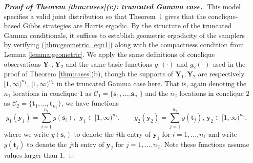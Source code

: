 \documentclass[12pt]{article}
\theoremstyle{definition}
\begin{document}
\begin{proof}[\bf Proof of Theorem \ref{thm:cases}(c): truncated Gamma case.]
This model specifies a valid joint distribution so that Theorem~1 gives that the conclique-based Gibbs strategies are Harris ergodic.  By the structure of the truncated Gamma conditionals, it suffices to establish geometric ergodicity of the samplers  by verifying (\ref{thm:geometric_eqn1})  along with the compactness condition from Lemma \ref{lemma:geometric}.
We apply the same definitions of  conclique observations $\boldsymbol Y_1,\boldsymbol Y_2$ and the same basic functions $g_1(\cdot)$ and $g_2(\cdot)$
  used in the proof of Theorem \ref{thm:cases}(b), though the supports of $\boldsymbol Y_1,\boldsymbol Y_2$ are respectively 
  $[1,\infty)^{n_1}$, $[1,\infty)^{n_2}$ in the truncated Gamma case here.   That is, again denoting the $n_1$ locations in conclique $1$ as $\mathcal{C}_1 = \{\boldsymbol s_1, \dots, \boldsymbol  s_{n_1}\}$ and the $n_2$ locations in conclique $2$ as $\mathcal{C}_2 = \{\boldsymbol t_1  , \dots, \boldsymbol t_{n_2}\}$, we have functions 
\[
g_{1}(\boldsymbol y_1) =
 \sum_{i=1}^{n_1}  y(\boldsymbol s_i ),   \;\,\boldsymbol y_1 \in [1,\infty)^{n_1},  \qquad
  g_{2}(\boldsymbol y_2) =   \sum_{j=1}^{n_2} y(\boldsymbol t_j), \,\boldsymbol y_2 \in  [1,\infty)^{n_2},  \]
  where we write $y(\boldsymbol s_i )$ to denote the $i$th entry of $\boldsymbol y_1$ for $i=1,\ldots,n_1$ and write $y(\boldsymbol t_j )$ to denote the $j$th entry of $\boldsymbol y_2$ for $j=1,\ldots,n_2$.  Note these functions assume values larger than 1.


\end{proof}
\end{document}
